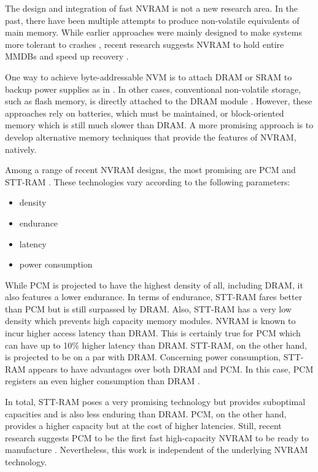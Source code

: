 The design and integration of fast \ac{NVRAM} is not a new research area. In the
past, there have been multiple attempts to produce non-volatile equivalents of
main memory. While earlier approaches were mainly designed to make systems more
tolerant to crashes \cite{molina1992main}, recent research suggests \ac{NVRAM}
to hold entire \acp{MMDB} and speed up recovery \cite{oukid2015instant,
schwalb2016hyrise, andrei2017sap}.

One way to achieve byte-addressable \ac{NVM} is to attach \ac{DRAM} or \ac{SRAM}
to backup power supplies as in \cite{liskov1991replication, wang2002conquest}.
In other cases, conventional non-volatile storage, such as flash memory, is
directly attached to the \ac{DRAM} module \cite{shi2010write, huang2014design,
oe2016feasibility}. However, these approaches rely on batteries, which must be
maintained, or block-oriented memory which is still much slower than DRAM. A
more promising approach is to develop alternative memory techniques that provide
the features of \ac{NVRAM}, natively.

Among a range of recent \ac{NVRAM} designs, the most promising are \ac{PCM} and
\ac{STT-RAM} \cite{zilberberg2013phase, mittal2016survey, jain2017computing}.
These technologies vary according to the following parameters:

\begin{itemize}
    \item density
    \item endurance
    \item latency
    \item power consumption
\end{itemize}

While \ac{PCM} is projected to have the highest density of all, including
\ac{DRAM}, it also features a lower endurance. In terms of endurance,
\ac{STT-RAM} fares better than \ac{PCM} but is still surpassed by \ac{DRAM}.
Also, \ac{STT-RAM} has a very low density which prevents high capacity memory
modules. \ac{NVRAM} is known to incur higher access latency than \ac{DRAM}. This
is certainly true for \ac{PCM} which can have up to 10\% higher latency than \ac{DRAM}.
\ac{STT-RAM}, on the other hand, is projected to be on a par with \ac{DRAM}.
Concerning power consumption, \ac{STT-RAM} appears to have advantages over both
\ac{DRAM} and \ac{PCM}. In this case, \ac{PCM} registers an even higher
consumption than \ac{DRAM} \cite{mittal2016survey}.

In total, \ac{STT-RAM} poses a very promising technology but provides suboptimal
capacities and is also less enduring than \ac{DRAM}. \ac{PCM}, on the other
hand, provides a higher capacity but at the cost of higher latencies. Still,
recent research suggests \ac{PCM} to be the first fast high-capacity \ac{NVRAM}
to be ready to manufacture \cite{zilberberg2013phase, dulloor2014system,
mittal2016survey}. Nevertheless, this work is independent of the underlying
NVRAM technology.

